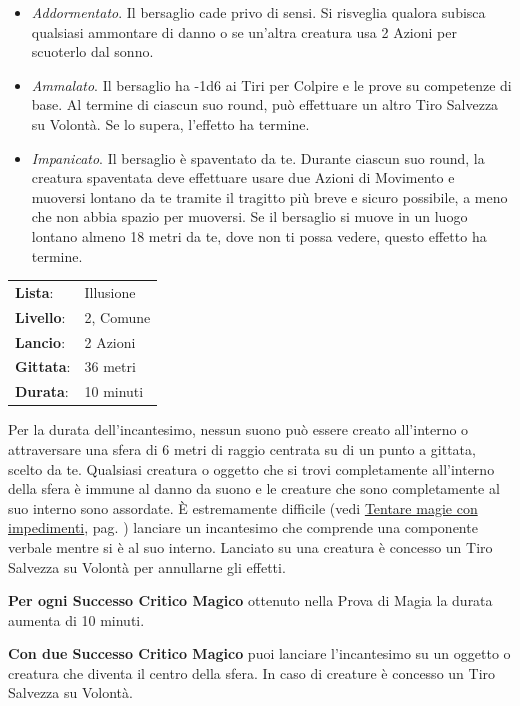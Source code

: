 \begin{multicols}{2}
\begin{itemize}[leftmargin=*] \setlength{\itemsep}{0pt}
	\item \emph{Addormentato}. Il bersaglio cade privo di sensi. Si risveglia qualora subisca qualsiasi ammontare di danno o se un'altra creatura usa 2 Azioni per scuoterlo dal sonno.
	\item \emph{Ammalato}. Il bersaglio ha -1d6 ai Tiri per Colpire e le prove su competenze di base. Al termine di ciascun suo round, può effettuare un altro Tiro Salvezza su Volontà. Se lo supera, l'effetto ha termine.
	\item \emph{Impanicato}. Il bersaglio è spaventato da te. Durante ciascun suo round, la creatura spaventata deve effettuare usare due Azioni di Movimento e muoversi lontano da te tramite il tragitto più breve e sicuro possibile, a meno che non abbia spazio per muoversi. Se il bersaglio si muove in un luogo lontano almeno 18 metri da te, dove non ti possa vedere, questo effetto ha termine.
\end{itemize}

\noindent\begin{tabularx}{\linewidth}{p{1.3cm}X}
	\rowcolor{gray!20}\textbf{Lista}: & Illusione \\
	\textbf{Livello}: & 2, Comune \\
	\rowcolor{gray!20}\textbf{Lancio}: & 2 Azioni \\
	\textbf{Gittata}: & 36 metri \\
	\rowcolor{gray!20}\textbf{Durata}: & 10 minuti \\
\end{tabularx}\smallskip

Per la durata dell'incantesimo, nessun suono può essere creato all'interno o attraversare una sfera di 6 metri di raggio centrata su di un punto a gittata, scelto da te. Qualsiasi creatura o oggetto che si trovi completamente all'interno della sfera è immune al danno da suono e le creature che sono completamente al suo interno sono assordate. È estremamente difficile (vedi \hyperlink{magieconimpedimenti}{Tentare magie con impedimenti}, pag. \pageref{magieconimpedimenti} ) lanciare un incantesimo che comprende una componente verbale mentre si è al suo interno. Lanciato su una creatura è concesso un Tiro Salvezza su Volontà per annullarne gli effetti.

\textbf{Per ogni Successo Critico Magico} ottenuto nella Prova di Magia la durata aumenta di 10 minuti.

\textbf{Con due Successo Critico Magico} puoi lanciare l'incantesimo su un oggetto o creatura che diventa il centro della sfera. In caso di creature è concesso un Tiro Salvezza su Volontà.


\end{multicols}
